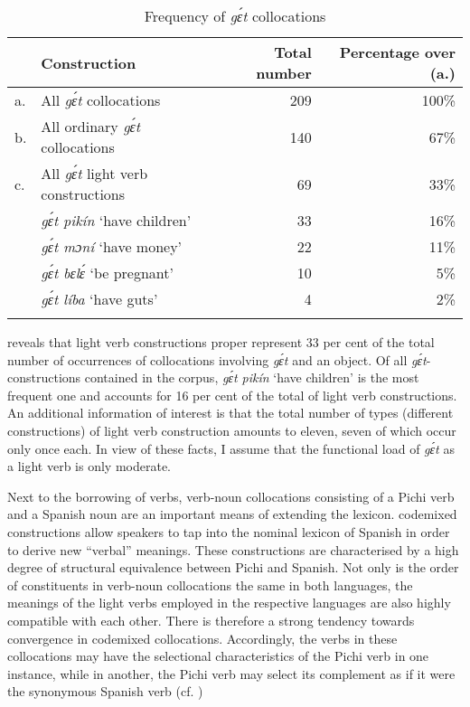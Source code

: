 \begin{table}
\caption{Frequency of \textit{gɛ́t} collocations}
\label{tab:key:9.8}

\begin{tabularx}{\textwidth}{lXrr}
\lsptoprule
& Construction & Total number & Percentage over (a.)\\
\midrule
a. & All \textit{gɛ́t} collocations & 209 & 100\%\\
\tablevspace 
b. & All ordinary \textit{gɛ́t} collocations & 140 & 67\%\\
\tablevspace
c. & All \textit{gɛ́t} light verb constructions & 69 & 33\%\\
   & \textit{gɛ́t pikín}   ‘have children’ & 33 & 16\%\\
   & \textit{gɛ́t mɔní}  ‘have money’ & 22 & 11\%\\
   & \textit{gɛ́t bɛlɛ́}  ‘be pregnant’ & 10 & 5\%\\
   & \textit{gɛ́t líba}   ‘have guts’ & 4 & 2\%\\
\lspbottomrule
\end{tabularx}
\end{table}
 reveals that light verb constructions proper represent 33 per cent of the total number of occurrences of collocations involving \textit{gɛ́t} and an object. Of all \textit{gɛ́t}-construc\-tions contained in the corpus, \textit{gɛ́t pikín} ‘have children’ is the most frequent one and accounts for 16 per cent of the total of light verb constructions. An additional information of interest is that the total number of types (different constructions) of light verb construction amounts to eleven, seven of which occur only once each. In view of these facts, I assume that the functional load of \textit{gɛ́t} as a light verb is only moderate.


Next to the borrowing of  verbs, verb-noun collocations consisting of a Pichi verb and a Spanish noun are an important means of extending the lexicon. codemixed constructions allow speakers to tap into the nominal lexicon of Spanish in order to derive new “verbal” meanings. These constructions are characterised by a high degree of structural equivalence between Pichi and Spanish. Not only is the order of constituents in verb-noun collocations the same in both languages, the meanings of the light verbs employed in the respective languages are also highly compatible with each other. There is therefore a strong tendency towards convergence in codemixed collocations. Accordingly, the verbs in these collocations may have the selectional characteristics of the Pichi verb in one instance, while in another, the Pichi verb may select its complement as if it were the synonymous Spanish verb (cf. \citealt[184]{Muysken2000})




